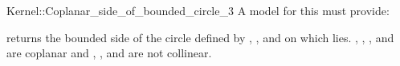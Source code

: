 \begin{ccRefFunctionObjectConcept}{Kernel::Coplanar_side_of_bounded_circle_3}
A model for this must provide:


         {returns the bounded side of the circle defined
          by , , and  on which  lies.
          \ccPrecond {}, , , and  are coplanar and
          , , and  are not collinear.}

\end{ccRefFunctionObjectConcept}


